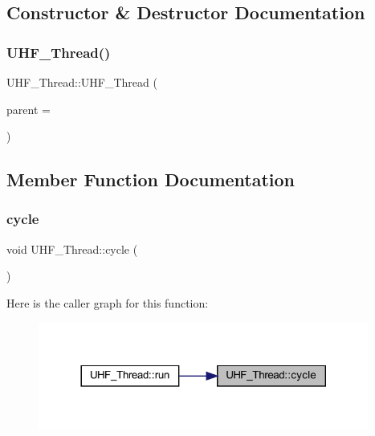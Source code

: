\subsection{Constructor \& Destructor Documentation}
\mbox{\label{class_u_h_f___thread_a4e345d08f3f78642458925017371cac2}} 
\subsubsection{\texorpdfstring{UHF\_Thread()}{UHF\_Thread()}}
{\footnotesize\ttfamily U\+H\+F\+\_\+\+Thread\+::\+U\+H\+F\+\_\+\+Thread (\begin{DoxyParamCaption}\item[{Q\+Object $\ast$}]{parent = {} }\end{DoxyParamCaption})\hspace{0.3cm}{\ttfamily [explicit]}}



\subsection{Member Function Documentation}
\mbox{\label{class_u_h_f___thread_a232f1c855e0b835beebcdb4a6b6a4484}} 
\subsubsection{\texorpdfstring{cycle}{cycle}}
{\footnotesize\ttfamily void U\+H\+F\+\_\+\+Thread\+::cycle (\begin{DoxyParamCaption}{ }\end{DoxyParamCaption})\hspace{0.3cm}{\ttfamily [signal]}}

Here is the caller graph for this function\+:
\nopagebreak
\begin{figure}[H]
\begin{center}
\leavevmode
\includegraphics[width=308pt]{class_u_h_f___thread_a232f1c855e0b835beebcdb4a6b6a4484_icgraph}
\end{center}
\end{figure}
\mbox{\label{class_u_h_f___thread_a0bb3c8d9ac1290986ce318819dc4ecbf}} 
